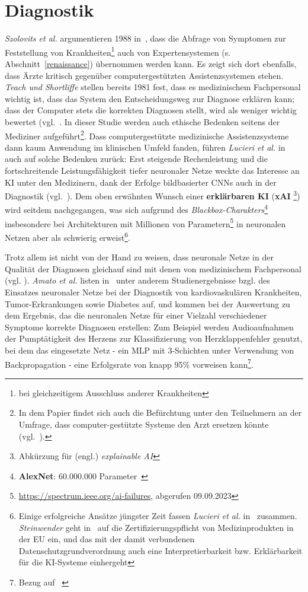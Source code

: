 \section{Diagnostik}\label{sec:diagnostik}
\textit{Szolovits et al.} argumentieren 1988 in~\cite{Szo88}, dass die Abfrage von Symptomen zur Feststellung von Krankheiten\footnote{
    bei gleichzeitigem Ausschluss anderer Krankheiten
} auch von Expertensystemen (s. Abschnitt~\ref{renaissance}) übernommen werden kann.
Es zeigt sich dort ebenfalls, dass Ärzte kritisch gegenüber computergestützten Assistenzsystemen stehen. \textit{Teach und Shortliffe} stellen bereits 1981 fest, dass es medizinischem Fachpersonal wichtig ist, dass das System den Entscheidungsweg zur Diagnose erklären kann; dass der Computer stets die korrekten Diagnosen stellt, wird als weniger wichtig bewertet (vgl.~\cite[551, ``Table V``: ``D.1`` sowie ``D14``]{TS81}. In dieser Studie werden auch ethische Bedenken seitens der Mediziner aufgeführt\footnote{
    In dem Papier findet sich auch die Befürchtung unter den Teilnehmern an der Umfrage, dass computer-gestützte Systeme den Arzt ersetzen könnte (vgl.~\cite[543]{TS81}).
}. Dass computergestützte medizinische Assistenzsysteme dann kaum Anwendung im klinischen Umfeld fanden, führen \textit{Lucieri et al.} in~\cite{LBDA22} auch auf solche Bedenken zurück: Erst steigende Rechenleistung und die fortschreitende Leistungsfähigkeit tiefer neuronaler Netze weckte das Interesse an KI unter den Medizinern, dank der Erfolge bildbasierter CNNs auch in der Diagnostik (vgl.~\cite[728]{LBDA22}). Dem oben erwähnten Wunsch einer \textbf{erklärbaren KI} (\textbf{xAI} \footnote{
    Abkürzung für (engl.) \textit{explainable AI}
}) wird seitdem nachgegangen, was sich aufgrund des \textit{Blackbox-Charakters}\footnote{
    \textbf{AlexNet}: 60.000.000 Parameter~\cite[1]{KSH12}
} insbesondere bei Architekturen mit Millionen von Parametern\footnote{
    \url{https://spectrum.ieee.org/ai-failures}, abgerufen 09.09.2023
} in neuronalen Netzen aber als schwierig erweist\footnote{
    Einige erfolgreiche Ansätze jüngster Zeit fassen \textit{Lucieri et al.} in~\cite[733 ff]{LBDA22} zusammen. \textit{Steinwender} geht in~\cite[765]{Ste22} auf die Zertifizierungspflicht von Medizinprodukten in der EU ein, und das mit der damit verbundenen Datenschutzgrundverordnung auch eine Interpretierbarkeit bzw. Erklärbarkeit für die KI-Systeme einhergeht
}.

Trotz allem ist nicht von der Hand zu weisen, dass neuronale Netze in der Qualität der Diagnosen gleichauf sind mit denen von medizinischem Fachpersonal (vgl. \cite[1]{SZJ+19}). \textit{Amato et al.} listen in~\cite{ALP+13} unter anderem Studienergebnisse bzgl. des Einsatzes neuronaler Netze bei der Diagnostik von kardiovaskulären Krankheiten, Tumor-Erkrankungen sowie Diabetes auf, und kommen bei der Auswertung zu dem Ergebnis, das die neuronalen Netze für einer Vielzahl verschiedener Symptome korrekte Diagnosen erstellen: Zum Beispiel werden Audioaufnahmen der Pumptätigkeit des Herzens zur Klassifizierung von Herzklappenfehler genutzt, bei dem das eingesetzte Netz - ein MLP mit 3-Schichten unter Verwendung von Backpropagation - eine Erfolgsrate von knapp 95\% vorweisen kann\footnote{Bezug auf ~\cite[71]{Ugu12}}.

